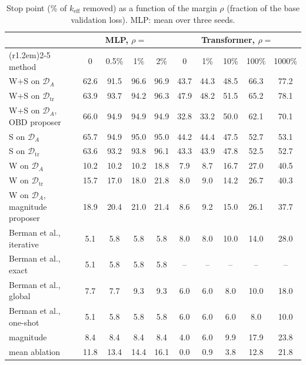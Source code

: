 \documentclass[11pt,a4paper]{article}
\theoremstyle{definition}
\newcommand{\D}{\mathcal{D}}
\newcommand{\keff}{k_{\mathrm{eff}}}
\newcommand{\Dtr}{\D_{\mathrm{tr}}}
\newcommand{\DA}{\D_{A}}
\newcommand{\WS}{\textsf{W+S}}
\newcommand{\Wo}{\textsf{W}}
\newcommand{\So}{\textsf{S}}
\begin{document}
\begin{table}[t]
\centering\small
\caption{Stop point (\% of $\keff$ removed) as a function of the margin $\rho$ (fraction of
the base validation loss). MLP: mean over three seeds.}
\label{tab:margins}
\setlength{\tabcolsep}{4.2pt}
\begin{tabular}{@{}lcccc@{\hspace{1.0em}}ccccc@{}}
\toprule
& \multicolumn{4}{c}{MLP, $\rho=$} & \multicolumn{5}{c}{Transformer, $\rho=$}\\
\cmidrule(r{1.2em}){2-5}\cmidrule{6-10}
method & 0 & 0.5\% & 1\% & 2\% & 0 & 1\% & 10\% & 100\% & 1000\%\\
\midrule
\WS{} on $\DA$ & 62.6 & 91.5 & 96.6 & 96.9 & 43.7 & 44.3 & 48.5 & 66.3 & 77.2\\
\WS{} on $\Dtr$ & 63.9 & 93.7 & 94.2 & 96.3 & 47.9 & 48.2 & 51.5 & 65.2 & 78.1\\
\WS{} on $\DA$, OBD proposer & 66.0 & 94.9 & 94.9 & 94.9 & 32.8 & 33.2 & 50.0 & 62.1 & 70.1\\
\So{} on $\DA$ & 65.7 & 94.9 & 95.0 & 95.0 & 44.2 & 44.4 & 47.5 & 52.7 & 53.1\\
\So{} on $\Dtr$ & 63.6 & 93.2 & 93.8 & 96.1 & 43.3 & 43.9 & 47.8 & 52.5 & 52.7\\
\Wo{} on $\DA$ & 10.2 & 10.2 & 10.2 & 18.8 & 7.9 & 8.7 & 16.7 & 27.0 & 40.5\\
\Wo{} on $\Dtr$ & 15.7 & 17.0 & 18.0 & 21.8 & 8.0 & 9.0 & 14.2 & 26.7 & 40.3\\
\Wo{} on $\DA$, magnitude proposer & 18.9 & 20.4 & 21.0 & 21.4 & 8.6 & 9.2 & 15.0 & 26.1 & 37.7\\
\midrule
Berman et al., iterative & 5.1 & 5.8 & 5.8 & 5.8 & 8.0 & 8.0 & 10.0 & 14.0 & 28.0\\
Berman et al., exact & 5.1 & 5.8 & 5.8 & 5.8 & -- & -- & -- & -- & --\\
Berman et al., global & 7.7 & 7.7 & 9.3 & 9.3 & 6.0 & 6.0 & 8.0 & 10.0 & 18.0\\
Berman et al., one-shot & 5.1 & 5.8 & 5.8 & 5.8 & 6.0 & 6.0 & 6.0 & 8.0 & 10.0\\
magnitude & 8.4 & 8.4 & 8.4 & 8.4 & 4.0 & 6.0 & 9.9 & 17.9 & 23.8\\
mean ablation & 11.8 & 13.4 & 14.4 & 16.1 & 0.0 & 0.9 & 3.8 & 12.8 & 21.8\\
\bottomrule
\end{tabular}
\end{table}
\end{document}
